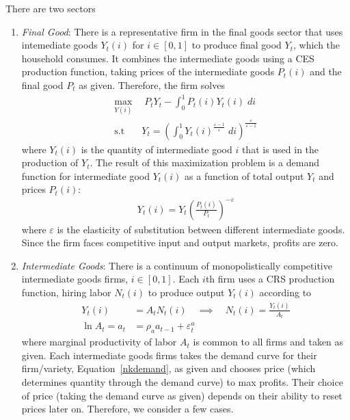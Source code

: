 \documentclass[12pt]{article}
\theoremstyle{plain}
\theoremstyle{definition}
\theoremstyle{remark}
\newcommand{\intzo}{\int_0^1}
\begin{document}
There are two sectors
\begin{enumerate}[label=(\roman*)]
  \item
    \emph{Final Good}:
    There is a representative firm in the final goods sector that uses
    intemediate goods $Y_t(i)$ for $i\in[0,1]$ to produce final good
    $Y_t$, which the household consumes.
    It combines the intermediate goods using a CES production function,
    taking prices of the intermediate goods $P_t(i)$ and the final good
    $P_t$ as given. Therefore, the firm solves
    \begin{align*}
      \max_{Y(i)} &\; P_tY_t - \intzo P_t(i)Y_t(i)\;di \\
      \text{s.t}\quad &
      Y_t = \left(
        \intzo Y_t(i)^{\frac{\varepsilon-1}{\varepsilon}}
        \; di
      \right)^{\frac{\varepsilon}{\varepsilon-1}}
    \end{align*}
    where $Y_t(i)$ is the quantity of intermediate good $i$ that is used
    in the production of $Y_t$. The result of this maximization problem
    is a demand function for intermediate good $Y_t(i)$ as a function of
    total output $Y_t$ and prices $P_t(i)$:
    \begin{align}
      Y_t(i) = Y_t\left(\frac{P_t(i)}{P_t}\right)^{-\varepsilon}
      \label{nkdemand}
    \end{align}
    where $\varepsilon$ is the elasticity of substitution between
    different intermediate goods. Since the firm faces competitive input
    and output markets, profits are zero.

  \item
    \emph{Intermediate Goods}:
    There is a continuum of monopolistically competitive intermediate
    goods firms, $i\in[0,1]$. Each $i$th firm uses a CRS production
    function, hiring labor $N_t(i)$ to produce output $Y_t(i)$ according
    to
    \begin{align*}
      Y_t(i) &= A_t N_t(i)
      \quad\implies\quad
      N_t(i) = \frac{Y_t(i)}{A_t}
      \\
      \ln A_t = a_t &= \rho_a a_{t-1} + \varepsilon_t^a
    \end{align*}
    where marginal productivity of labor $A_t$ is common to all firms
    and taken as given.  Each intermediate goods firms takes the demand
    curve for their firm/variety, Equation~\ref{nkdemand}, as given and
    chooses price (which determines quantity through the demand curve)
    to max profits. Their choice of price (taking the demand curve as
    given) depends on their ability to reset prices later on. Therefore,
    we consider a few cases.


\end{enumerate}
\end{document}
